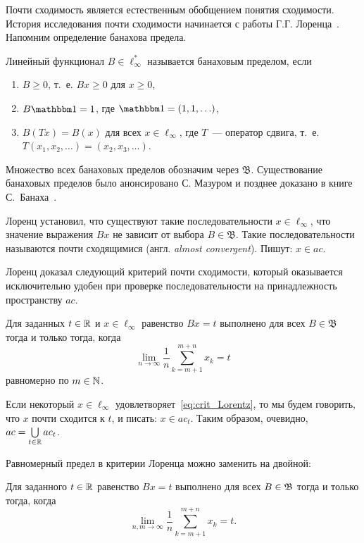 Почти сходимость является естественным обобщением понятия сходимости.
История исследования почти сходимости начинается с работы Г.Г. Лоренца~\cite{lorentz1948contribution}.
Напомним определение банахова предела.

\begin{definition}
	\label{def:Banach_limit}
	Линейный функционал $B\in \ell_\infty^*$ называется банаховым пределом,
	если
	\begin{enumerate}
		\item
			$B\geq0$, т.~е. $Bx \geq 0$ для $x \geq 0$,
		\item
			$B\one=1$, где $\one =(1,1,\ldots)$,
		\item
			$B(Tx)=B(x)$ для всех $x\in \ell_\infty$, где $T$~---
		оператор сдвига, т.~е. $T(x_1,x_2,\ldots)=(x_2,x_3,\ldots)$.
	\end{enumerate}
\end{definition}
Множество всех банаховых пределов обозначим через $\mathfrak{B}$.
Существование банаховых пределов было анонсировано С. Мазуром \cite{Mazur} и позднее доказано в книге С.~Банаха~\cite{banach2001theory_rus}.


Лоренц установил, что существуют такие последовательности $x\in\ell_\infty$,
что значение выражения $Bx$ не зависит от выбора $B\in\mathfrak{B}$.
Такие последовательности называются почти сходящимися (англ. \textit{almost convergent}).
Пишут: $x\in ac$.

Лоренц доказал следующий критерий почти сходимости,
который оказывается исключительно удобен при проверке последовательности на принадлежность пространству $ac$.

\begin{theorem}
	Для заданных $t\in\mathbb{R}$ и $x\in\ell_\infty$ равенство $Bx=t$ выполнено для всех $B\in\mathfrak{B}$
	тогда и только тогда, когда
	\begin{equation}
		\label{eq:crit_Lorentz}
		\lim_{n\to\infty} \frac{1}{n} \sum_{k=m+1}^{m+n} x_k = t
	\end{equation}
	равномерно по $m\in\mathbb{N}$.
\end{theorem}

Если некоторый $x\in\ell_\infty$ удовлетворяет~\eqref{eq:crit_Lorentz},
то мы будем говорить, что $x$ почти сходится к $t$,
и писать: $x\in ac_t$.
Таким образом, очевидно, $ac = \bigcup\limits_{t\in\mathbb{R}} ac_t$.

Равномерный предел в критерии Лоренца можно заменить на двойной:
\begin{theorem}
	Для заданного $t\in\mathbb{R}$ равенство $Bx=t$ выполнено для всех $B\in\mathfrak{B}$
	тогда и только тогда, когда
	\begin{equation}
		\label{eq:crit_Lorentz}
		\lim_{n,m\to\infty} \frac{1}{n} \sum_{k=m+1}^{m+n} x_k = t
		.
	\end{equation}
\end{theorem}

